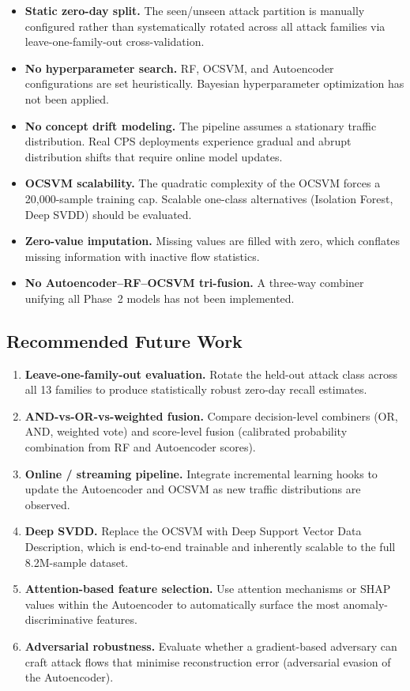 \documentclass[10pt,conference]{IEEEtran}
\begin{document}
\begin{itemize}[leftmargin=*,noitemsep]
  \item \textbf{Static zero-day split.} The seen/unseen attack partition
        is manually configured rather than systematically rotated across
        all attack families via leave-one-family-out cross-validation.
  \item \textbf{No hyperparameter search.} RF, OCSVM, and Autoencoder
        configurations are set heuristically. Bayesian hyperparameter
        optimization has not been applied.
  \item \textbf{No concept drift modeling.} The pipeline assumes a
        stationary traffic distribution. Real CPS deployments experience
        gradual and abrupt distribution shifts that require online model
        updates.
  \item \textbf{OCSVM scalability.} The quadratic complexity of the
        OCSVM forces a 20{,}000-sample training cap. Scalable one-class
        alternatives (Isolation Forest, Deep SVDD) should be evaluated.
  \item \textbf{Zero-value imputation.} Missing values are filled with
        zero, which conflates missing information with inactive flow
        statistics.
  \item \textbf{No Autoencoder–RF–OCSVM tri-fusion.} A three-way
        combiner unifying all Phase~2 models has not been implemented.
\end{itemize}

\subsection{Recommended Future Work}

\begin{enumerate}[leftmargin=*,noitemsep,topsep=0pt]
  \item \textbf{Leave-one-family-out evaluation.} Rotate the held-out
        attack class across all 13 families to produce statistically
        robust zero-day recall estimates.
  \item \textbf{AND-vs-OR-vs-weighted fusion.} Compare decision-level
        combiners (OR, AND, weighted vote) and score-level fusion
        (calibrated probability combination from RF and Autoencoder
        scores).
  \item \textbf{Online / streaming pipeline.} Integrate incremental
        learning hooks to update the Autoencoder and OCSVM as new
        traffic distributions are observed.
  \item \textbf{Deep SVDD.} Replace the OCSVM with Deep Support Vector
        Data Description, which is end-to-end trainable and inherently
        scalable to the full 8.2M-sample dataset.
  \item \textbf{Attention-based feature selection.} Use attention
        mechanisms or SHAP values within the Autoencoder to automatically
        surface the most anomaly-discriminative features.
  \item \textbf{Adversarial robustness.} Evaluate whether a
        gradient-based adversary can craft attack flows that minimise
        reconstruction error (adversarial evasion of the Autoencoder).
\end{enumerate}
\end{document}
